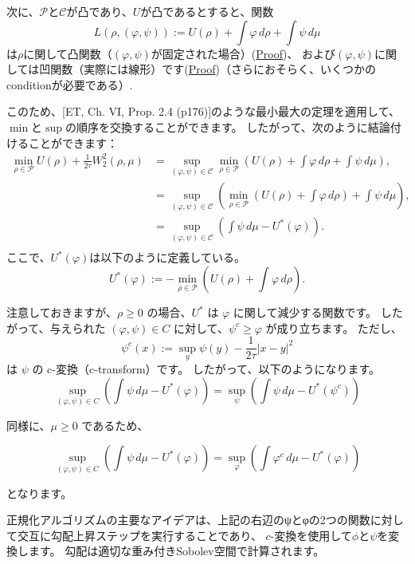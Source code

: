 \documentclass{jsarticle}
\theoremstyle{definition}
\begin{document}
次に、\(\mathcal{P}\)と\(\mathcal{C}\)が凸であり、\(U\)が凸であるとすると、関数
\[
  \label{eq:L}
  L(\rho, (\varphi, \psi)) := U(\rho) + \int \varphi \, d\rho + \int \psi \, d\mu
\]
は\hypertarget{rho_convex}{\(\rho\)に関して凸関数}（\((\varphi, \psi)\)が固定された場合）(\hyperlink{Proof:rho_convex}{Proof})、
および\hypertarget{varphipsi_concave}{\((\varphi, \psi)\)に関しては凹関数}（実際には線形）です(\hyperlink{Proof:varphipsi_concave}{Proof})（さらにおそらく、いくつかのconditionが必要である）.

このため、[ET, Ch. VI, Prop. 2.4 (p176)]のような最小最大の定理を適用して、\(\min\)と\(\sup\)の順序を交換することができます。
したがって、次のように結論付けることができます：
\begin{align*}
  \min_{\rho \in \mathcal{P}} U(\rho) + \frac{1}{2\tau} W_2^2(\rho, \mu) &= \sup_{(\varphi, \psi) \in \mathcal{C}} \min_{\rho \in \mathcal{P}} \left(U(\rho) + \int \varphi \, d\rho + \int \psi \, d\mu \right),\\
                                                                          &= \sup_{(\varphi, \psi) \in \mathcal{C}} \left(\min_{\rho \in \mathcal{P}} \left(U(\rho) + \int \varphi \, d\rho\right) + \int \psi \, d\mu\right),\\
                                                                          &= \sup_{(\varphi, \psi) \in \mathcal{C}} \left(\int \psi \, d\mu - U^*(\varphi)\right).\\
\end{align*}
ここで、$U^*(\varphi)$は以下のように定義している。 
\[
  U^*(\varphi) := -\min_{\rho \in \mathcal{P}} \left(U(\rho) + \int \varphi \, d\rho\right).
\]

注意しておきますが、\(\rho \geq 0\) の場合、\(U^*\) は \(\varphi\) に関して減少する関数です。
したがって、与えられた \((\varphi, \psi) \in C\) に対して、\(\psi^c \geq \varphi\) が成り立ちます。
ただし、
\[
  \psi^c(x) := \sup_y \psi(y) - \frac{1}{2\tau}|x-y|^2
\]
は \(\psi\) の c-変換（c-transform）です。
{\color{teal}したがって、以下のようになります。}
\[
\sup_{(\varphi, \psi) \in C} \left(\int \psi \, d\mu - U^*(\varphi)\right) = \sup_\psi \left(\int \psi \, d\mu - U^*(\psi^c)\right)
\]

同様に、\(\mu \geq 0\) であるため、

\[
\sup_{(\varphi, \psi) \in C} \left(\int \psi \, d\mu - U^*(\varphi)\right) = \sup_\varphi \left(\int \varphi^c \, d\mu - U^*(\varphi)\right)
\]

となります。

正規化アルゴリズムの主要なアイデアは、上記の右辺のψとφの2つの関数に対して交互に勾配上昇ステップを実行することであり、
$c$-変換を使用して$\phi$と$\psi$を変換します。
勾配は適切な重み付きSobolev空間で計算されます。
\end{document}
